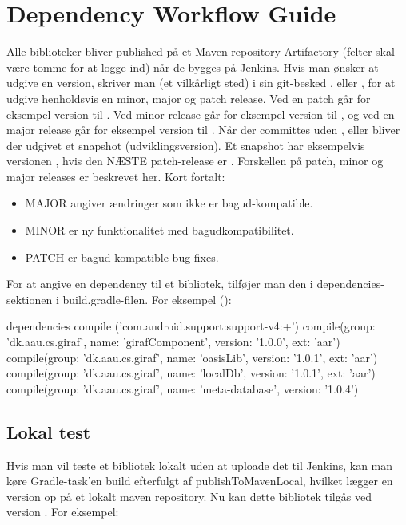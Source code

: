 \chapter{Dependency Workflow Guide}\label{app:dependency_workflow_guide}
Alle biblioteker bliver published på et Maven repository Artifactory (felter skal være tomme for at logge ind) når de bygges på Jenkins. Hvis man ønsker at udgive en version, skriver man (et vilkårligt sted) i sin git-besked ,  eller , for at udgive henholdsvis en minor, major og patch release. Ved en patch går for eksempel version  til . Ved minor release går for eksempel version  til , og ved en major release går for eksempel version  til . Når der committes uden ,  eller  bliver der udgivet et snapshot (udviklingsversion). Et snapshot har eksempelvis versionen , hvis den NÆSTE patch-release er . Forskellen på patch, minor og major releases er beskrevet her. Kort fortalt:
\begin{itemize}
  \item MAJOR angiver ændringer som ikke er bagud-kompatible.
  \item MINOR er ny funktionalitet med bagudkompatibilitet.
  \item PATCH er bagud-kompatible bug-fixes.
\end{itemize}

For at angive en dependency til et bibliotek, tilføjer man den i dependencies-sektionen i build.gradle-filen. For eksempel ():

\begin{gradlecode}[caption=Dekleration af dependencies,label=lst:decl_depe]
dependencies {
  compile ('com.android.support:support-v4:+')
  compile(group: 'dk.aau.cs.giraf', name: 'girafComponent', version: '1.0.0', ext: 'aar')
  compile(group: 'dk.aau.cs.giraf', name: 'oasisLib', version: '1.0.1', ext: 'aar')
  compile(group: 'dk.aau.cs.giraf', name: 'localDb', version: '1.0.1', ext: 'aar')
  compile(group: 'dk.aau.cs.giraf', name: 'meta-database', version: '1.0.4')
}
\end{gradlecode}

\section{Lokal test}
Hvis man vil teste et bibliotek lokalt uden at uploade det til Jenkins, kan man køre Gradle-task'en build efterfulgt af publishToMavenLocal, hvilket lægger en version  op på et lokalt maven repository. Nu kan dette bibliotek tilgås ved version . For eksempel: 

